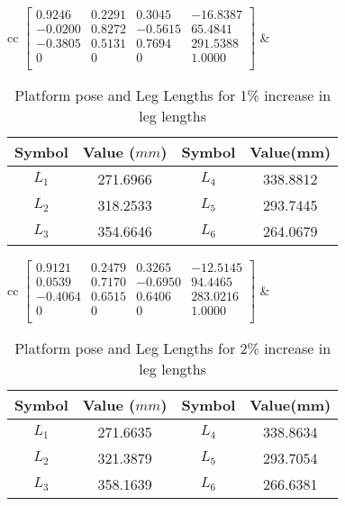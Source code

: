 \documentclass[10pt]{article}
\begin{document}
\begin{table*}[h!]
	\centering
	\begin{tabular}{cc}
		$\begin{bmatrix}
0.9246  & 0.2291 & 0.3045  & -16.8387 \\ 
-0.0200 & 0.8272 & -0.5615 & 65.4841  \\ 
-0.3805 & 0.5131 & 0.7694  & 291.5388 \\ 
0       & 0      & 0       & 1.0000   \\ 
		\end{bmatrix}$
		& 
		\begin{tabular}{cccc}
			\hline
			Symbol & Value ($mm$) & Symbol & Value(mm) \\
			\hline
			$L_1$ & 271.6966 & $L_4$ & 338.8812\\
			$L_2$ & 318.2533 & $L_5$ & 293.7445\\
			$L_3$ & 354.6646 & $L_6$ & 264.0679\\	 	\hline
		\end{tabular}
	\end{tabular}
	\caption{Platform pose and Leg Lengths for 1\% increase in leg lengths}
\end{table*}

\begin{table*}[h!]
	\centering
	\begin{tabular}{cc}
		$\begin{bmatrix}
		0.9121  & 0.2479 & 0.3265  & -12.5145 \\ 
		0.0539  & 0.7170 & -0.6950 & 94.4465  \\ 
		-0.4064 & 0.6515 & 0.6406  & 283.0216 \\ 
		0       & 0      & 0       & 1.0000   \\ 
		\end{bmatrix}$
		& 
		\begin{tabular}{cccc}
			\hline
			Symbol & Value ($mm$) & Symbol & Value(mm) \\
			\hline
			$L_1$ & 271.6635 & $L_4$ & 338.8634\\
			$L_2$ & 321.3879 & $L_5$ & 293.7054\\
			$L_3$ & 358.1639 & $L_6$ & 266.6381\\	 	\hline
		\end{tabular}
	\end{tabular}
	\caption{Platform pose and Leg Lengths for 2\% increase in leg lengths}
\end{table*}
\end{document}
